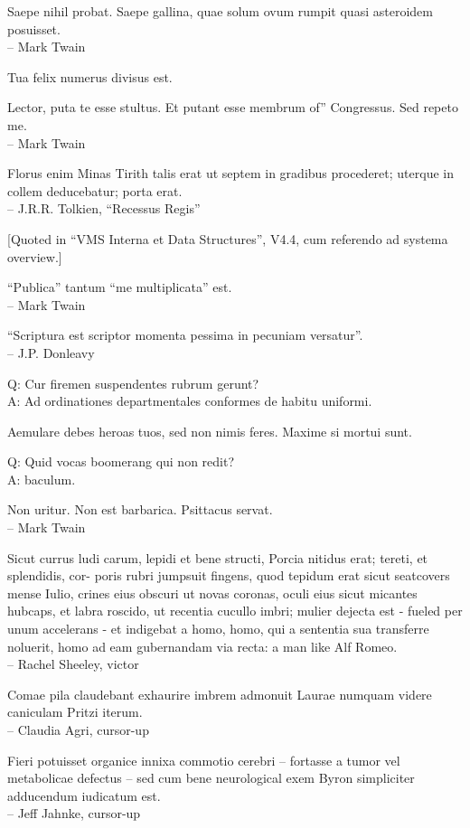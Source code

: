 \documentclass[titlepage,12pt]{memoir}
\begin{document}
Saepe nihil probat. Saepe gallina, quae solum ovum rumpit
quasi asteroidem posuisset.
\\-- Mark Twain

Tua felix numerus divisus est.

Lector, puta te esse stultus. Et putant esse membrum of”
Congressus. Sed repeto me.
\\-- Mark Twain

Florus enim Minas Tirith talis erat ut septem in gradibus procederet;
uterque in collem deducebatur;
porta erat.
\\-- J.R.R. Tolkien, “Recessus Regis”

[Quoted in “VMS Interna et Data Structures”, V4.4, cum
referendo ad systema overview.]

“Publica” tantum “me multiplicata” est.
\\-- Mark Twain

“Scriptura est scriptor momenta pessima in pecuniam versatur”.
\\-- J.P. Donleavy

Q: Cur firemen suspendentes rubrum gerunt?\\
A: Ad ordinationes departmentales conformes de habitu uniformi.

Aemulare debes heroas tuos, sed non nimis feres. Maxime
si mortui sunt.

Q: Quid vocas boomerang qui non redit?\\
A: baculum.

Non uritur. Non est barbarica. Psittacus servat.
\\-- Mark Twain

Sicut currus ludi carum, lepidi et bene structi, Porcia nitidus erat;
tereti, et splendidis, cor- poris rubri jumpsuit fingens, quod tepidum erat
sicut seatcovers mense Iulio, crines eius obscuri ut novas coronas, oculi eius sicut micantes
hubcaps, et labra roscido, ut recentia cucullo imbri;
mulier dejecta est - fueled per unum accelerans - et indigebat a
homo, homo, qui a sententia sua transferre noluerit, homo ad eam gubernandam
via recta: a man like Alf Romeo.
\\-- Rachel Sheeley, victor

Comae pila claudebant exhaurire imbrem admonuit Laurae numquam
videre caniculam Pritzi iterum.
\\-- Claudia Agri, cursor-up

Fieri potuisset organice innixa commotio cerebri -- fortasse a
tumor vel metabolicae defectus -- sed cum bene neurological exem
Byron simpliciter adducendum iudicatum est.
\\-- Jeff Jahnke, cursor-up
\end{document}
